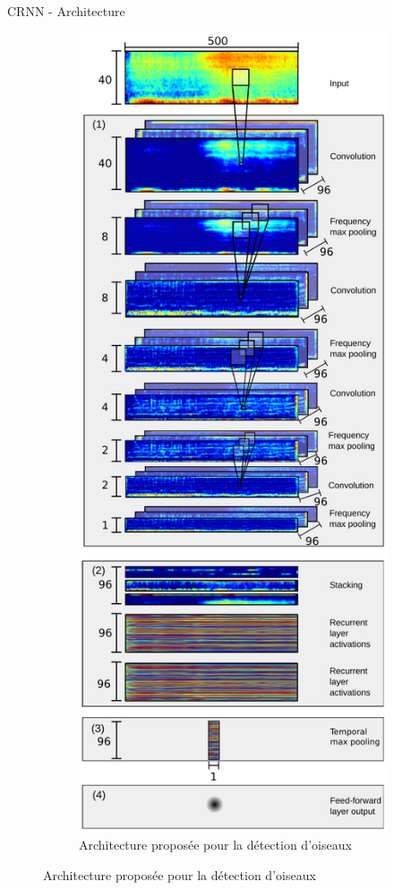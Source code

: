 \documentclass[compress,xcolor=table]{beamer}
\begin{document}
\begin{frame}{CRNN - Architecture}
\begin{figure}[ht]
\begin{subfigure}[b]{0.45\textwidth}
            \label{fig:CRNN.architecture.generic}
        \end{subfigure}
        \hfill
        \begin{subfigure}[b]{0.45\textwidth}
            \centering
            \includegraphics[width=\textwidth,height=0.8\textheight,keepaspectratio]{images/models/CRNN.architecture.birds.pdf}
            \caption{Architecture proposée pour la détection d'oiseaux}
            \label{fig:CRNN.architecture.birds}
        \end{subfigure}
    \end{figure}

\end{frame}
\end{document}
